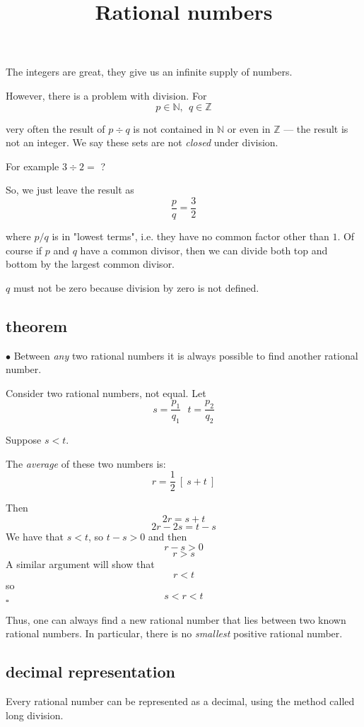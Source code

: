 \documentclass[11pt, oneside]{article}
\title{Rational numbers}
\date{}
\begin{document}
\maketitle
\Large
The integers are great, they give us an infinite supply of numbers.

However, there is a problem with division.  For
\[ p \in \mathbb{N}, \ \ q \in \mathbb{Z} \]

very often the result of $p  \div q$ is not contained in $\mathbb{N}$ or even in $\mathbb{Z}$ --- the result is not an integer. We say these sets are not \emph{closed} under division.

For example $3 \div 2 =$ ?

So, we just leave the result as 
\[ \frac{p}{q} = \frac{3}{2} \]

where $p/q$ is in "lowest terms", i.e. they have no common factor other than $1$.  Of course if $p$ and $q$ have a common divisor, then we can divide both top and bottom by the largest common divisor.

$q$ must not be zero because division by zero is not defined.

\subsection*{theorem}

$\bullet$  Between \emph{any} two rational numbers it is always possible to find another rational number.  

Consider two rational numbers, not equal.  Let
\[ s = \frac{p_1}{q_1} \ \ \ t = \frac{p_2}{q_2} \]

Suppose $s < t$.

The \emph{average} of these two numbers is:
\[ r = \frac{1}{2} \ [ \ s + t \ ] \]

Then
\[ 2r = s + t \]
\[ 2r - 2s = t - s \]
We have that $s < t$, so $t - s > 0$ and then
\[ r - s > 0 \]
\[ r  > s \]
A similar argument will show that
\[ r < t \]
so
\[ s < r < t \]
$\square$

Thus, one can always find a new rational number that lies between two known rational numbers.  In particular, there is no \emph{smallest} positive rational number.

\subsection*{decimal representation}

Every rational number can be represented as a decimal, using the method called long division.
\end{document}
